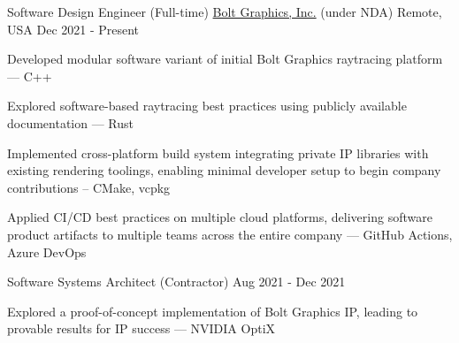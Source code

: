 

\begin{cventries}
  \cventry
    {Software Design Engineer (Full-time)} %
    {\href{https://www.bolt.graphics/}{Bolt Graphics, Inc.} (under NDA)} %
    {Remote, USA} %
    {Dec 2021 - Present} %
    {
      \begin{cvitems} %
        \item Developed modular software variant of initial Bolt Graphics raytracing platform --- C++
        \item Explored software-based raytracing best practices using publicly available documentation --- Rust
        \item Implemented cross-platform build system integrating private IP libraries with existing rendering toolings, enabling minimal developer setup to begin company contributions -- CMake, vcpkg
        \item Applied CI/CD best practices on multiple cloud platforms, delivering software product artifacts to multiple teams across the entire company --- GitHub Actions, Azure DevOps
      \end{cvitems}
    }

  \cventry
    {Software Systems Architect (Contractor)} %
    {} %
    {} %
    {Aug 2021 - Dec 2021} %
    {
      \begin{cvitems} %
        \item Explored a proof-of-concept implementation of Bolt Graphics IP, leading to provable results for IP success --- NVIDIA OptiX
      \end{cvitems}
    }


\end{cventries}
